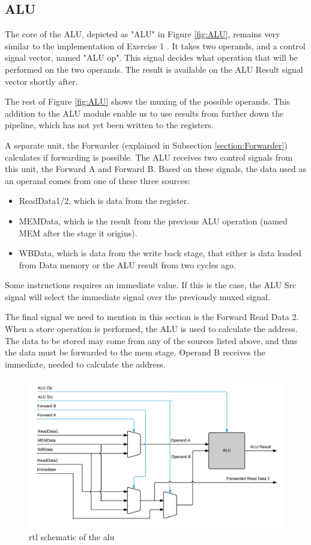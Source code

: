 \subsection{ALU}
The core of the ALU, depicted as "ALU" in Figure \ref{fig:ALU}, remains very similar to the implementation of Exercise 1 \cite{ex1report}. It takes two operands, and a control signal vector, named "ALU op". This signal decides what operation that will be performed on the two operands. The result is available on the ALU Result signal vector shortly after.

The rest of Figure \ref{fig:ALU} shows the muxing of the possible operands. This addition to the ALU module enable us to use results from further down the pipeline, which has not yet been written to the registers.

A separate unit, the Forwarder (explained in Subsection \ref{section:Forwarder}) calculates if forwarding is possible. The ALU receives two control signals from this unit, the Forward A and Forward B.
Based on these signals, the data used as an operand comes from one of these three sources:
\begin{itemize}
\item ReadData1/2, which is data from the register.
\item MEMData, which is the result from the previous ALU operation (named MEM after the stage it origins).
\item WBData, which is data from the write back stage, that either is data loaded from Data memory or the ALU result from two cycles ago.
\end{itemize}
 
Some instructions requires an immediate value. If this is the case, the ALU Src signal will select the immediate signal over the previously muxed signal.

The final signal we need to mention in this section is the Forward Read Data 2. When a store operation is performed, the ALU is used to calculate the address. The data to be stored may come from any of the sources listed above, and thus the data must be forwarded to the mem stage. Operand B receives the immediate, needed to calculate the address.

\begin{figure}[h!]
    \includegraphics[width=\linewidth]{img/alu.png}
    \caption{rtl schematic of the alu}
    \label{fig:alu}
\end{figure}


